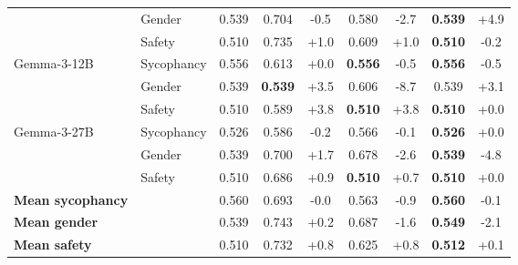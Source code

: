 \begin{table}[t]
\begin{tabular}{l l c | c c | c c | c c}
 & Gender & 0.539 & 0.704 & -0.5 & 0.580 & -2.7 & \textbf{0.539} & +4.9 \\
 & Safety & 0.510 & 0.735 & +1.0 & 0.609 & +1.0 & \textbf{0.510} & -0.2 \\
\addlinespace[2pt]
Gemma-3-12B & Sycophancy & 0.556 & 0.613 & +0.0 & \textbf{0.556} & -0.5 & \textbf{0.556} & -0.5 \\
 & Gender & 0.539 & \textbf{0.539} & +3.5 & 0.606 & -8.7 & 0.539 & +3.1 \\
 & Safety & 0.510 & 0.589 & +3.8 & \textbf{0.510} & +3.8 & \textbf{0.510} & +0.0 \\
\addlinespace[2pt]
Gemma-3-27B & Sycophancy & 0.526 & 0.586 & -0.2 & 0.566 & -0.1 & \textbf{0.526} & +0.0 \\
 & Gender & 0.539 & 0.700 & +1.7 & 0.678 & -2.6 & \textbf{0.539} & -4.8 \\
 & Safety & 0.510 & 0.686 & +0.9 & \textbf{0.510} & +0.7 & \textbf{0.510} & +0.0 \\
\addlinespace[2pt]
\midrule
\textbf{Mean sycophancy} &  & 0.560 & 0.693 & -0.0 & 0.563   & -0.9 & \textbf{0.560} & -0.1 \\
\textbf{Mean gender} &  & 0.539 & 0.743 & +0.2 & 0.687   & -1.6 & \textbf{0.549} & -2.1 \\
\textbf{Mean safety} &  & 0.510 & 0.732 & +0.8 & 0.625   & +0.8 & \textbf{0.512} & +0.1 \\
\bottomrule
\end{tabular}
\end{table}
